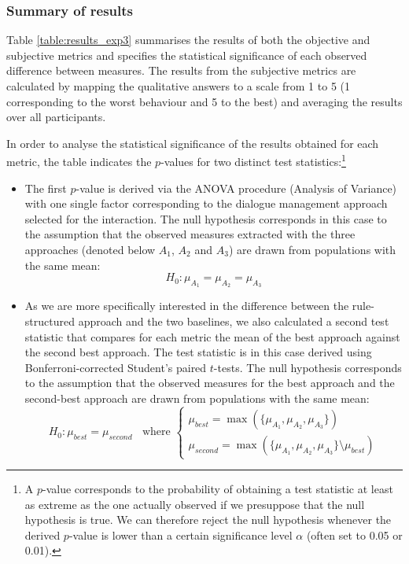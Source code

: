 \subsubsection*{Summary of results}

Table \ref{table:results_exp3} summarises the results of both the objective and subjective metrics and specifies the statistical significance of each observed difference between measures.  The results from the subjective metrics are calculated by mapping the qualitative answers to a scale from 1 to 5 (1 corresponding to the worst behaviour and 5 to the best) and averaging the results over all participants. 

In order to analyse the statistical significance of the results obtained for each metric, the table indicates the $p$-values for two distinct test statistics:\footnote{A $p$-value corresponds to the probability of obtaining a test statistic at least as extreme as the one actually observed if we presuppose that the null hypothesis is true.  We can therefore reject the null hypothesis whenever the derived $p$-value is lower than a certain significance level $\alpha$ (often set to 0.05 or 0.01).}
\begin{itemize}
\item The first $p$-value is derived via the ANOVA procedure (Analysis of Variance) with one single factor corresponding to the dialogue management approach selected for the interaction. The null hypothesis  corresponds in this case to the assumption that the observed measures extracted with the three approaches (denoted below $A_1$, $A_2$ and $A_3$) are drawn from populations with the same mean:
\begin{equation}
H_0 : \mu_{A_1} = \mu_{A_2} = \mu_{A_3}
\end{equation}  

\item As we are more specifically interested in the difference between the rule-structured approach and the two baselines, we also calculated a second test statistic that compares for each metric the mean of the best approach against the second best approach. The test statistic is in this case derived using Bonferroni-corrected Student's paired $t$-tests.  The null hypothesis corresponds to the assumption that the observed measures for the best approach and the second-best  approach are drawn from populations with the same mean:
\begin{equation}
H_0 : \mu_{\mathit{best}} = \mu_{\mathit{second}} \ \  \ \ \text{where } \begin{cases}\mu_{\mathit{best}} = \max(\{\mu_{A_1}, \mu_{A_2}, \mu_{A_3}\}) \\ 
\mu_{\mathit{second}} = \max(\{\mu_{A_1}, \mu_{A_2}, \mu_{A_3}\} \setminus \mu_{\mathit{best}}) 
\end{cases}
\end{equation}

\end{itemize}

